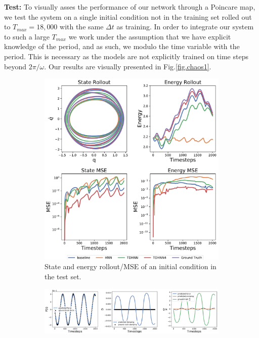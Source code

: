 \documentclass[twoside]{article}
\begin{document}
\textbf{Test:} To visually asses the performance of our network through a Poincare map, we test the system on a single initial condition not in the training set rolled out to $T_{max} = 18,000$ with the same $\Delta t$ as training. In order to integrate our system to such a large $T_{max}$ we work under the assumption that we have explicit knowledge of the period, and as such, we modulo the time variable with the period. This is necessary as the models are not explicitly trained on time steps beyond $2\pi/\omega$. Our results are visually presented in Fig.\ref{fig.chaos1}.  
\begin{figure}[h!]
\centering
\captionsetup{justification=centering}
	\begin{subfigure}[b]{0.4\textwidth}
		\centering
		\includegraphics[width=\textwidth]{figures/relativity_pred.pdf}
		\caption{State and energy rollout/MSE of an initial condition in the test set.}
	\end{subfigure}
	\begin{subfigure}[b]{0.48\textwidth}
		\centering
		\includegraphics[width=\textwidth]{figures/dpdt_relativity.pdf}

\end{subfigure}
\end{figure}
\end{document}
